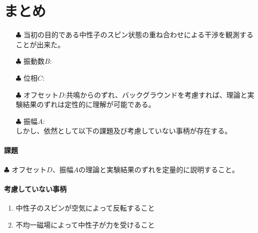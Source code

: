 
\section{まとめ}
\begin{itemize}
\item[$\clubsuit$]当初の目的である中性子のスピン状態の重ね合わせによる干渉を観測することが出来た。\\
\item[$\clubsuit$]振動数$B$:\\
\item[$\clubsuit$]位相$C$:\\
\item[$\clubsuit$]オフセット$D$:共鳴からのずれ、バックグラウンドを考慮すれば、理論と実験結果のずれは定性的に理解が可能である。\\
\item[$\clubsuit$]振幅$A$:\\
しかし、依然として以下の課題及び考慮していない事柄が存在する。
\end{itemize}
\paragraph{課題}
$\clubsuit$
オフセット$D$、振幅$A$の理論と実験結果のずれを定量的に説明すること。\\
\paragraph{考慮していない事柄}
\begin{enumerate}
\item 中性子のスピンが空気によって反転すること
\item 不均一磁場によって中性子が力を受けること
\end{enumerate}
